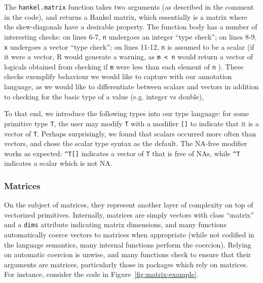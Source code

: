 \documentclass[acmsmall,review,anonymous]{acmart}\settopmatter{printfolios=true,printccs=false,printacmref=false}
\newcommand{\code}[1]{{\lstinline[style=Rin]!#1!}\xspace}
\begin{document}
The \code{hankel.matrix} function takes two arguments (as described in the comment in the code), and returns a Hankel matrix, which essentially is a matrix where the skew-diagonals have a desirable property.
The function body has a number of interesting checks:
on lines 6-7, \code{n} undergoes an integer ``type check'';
on lines 8-9, \code{x} undergoes a vector ``type check'';
on lines 11-12, \code{n} is assumed to be a scalar (if it were a vector, R would generate a warning, as \code{m < n} would return a vector of logicals obtained from checking if \code{m} were less than each element of \code{n} ).
These checks exemplify behaviour we would like to capture with our annotation language, as we would like to differentiate between scalars and vectors in addition to checking for the basic type of a value (e.g. integer vs double), 

To that end, we introduce the following types into our type language:
for some primitive type \code{T}, the user may modify \code{T} with a modifier \code{[]} to indicate that it is a vector of \code{T}.
Perhaps surprisingly, we found that scalars occurred more often than vectors, and chose the scalar type syntax as the default. 
The NA-free modifier works as expected: \code{^T[]} indicates a vector of \code{T} that is free of NAs, while \code{^T} indicates a scalar which is not NA.
 
%
%
\subsubsection{Matrices}

On the subject of matrices, they represent another layer of complexity on top of vectorized primitives.
Internally, matrices are simply vectors with class ``matrix'' and a \code{dims} attribute indicating matrix dimensions, and many functions automatically coerce vectors to matrices when appropriate (while not codified in the language semantics, many internal functions perform the coercion).
Relying on automatic coercion is unwise, and many functions check to ensure that their arguments are matrices, particularly those in packages which rely on matrices.
For instance, consider the code in Figure~\ref{fig:matrix-example}.
\end{document}
